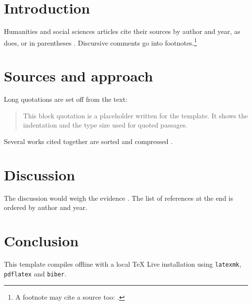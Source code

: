 \section{Introduction}
Humanities and social sciences articles cite their sources by author and year, as
\textcite{psg-hss-monograph} does, or in parentheses \parencite[see][12--14]{psg-hss-chapter}.
Discursive comments go into footnotes.\footnote{A footnote may cite a source too:
\cite{psg-hss-monograph}.}

\section{Sources and approach}
Long quotations are set off from the text:
\begin{quote}
  This block quotation is a placeholder written for the template. It shows the indentation and
  the type size used for quoted passages.
\end{quote}
Several works cited together are sorted and compressed
\parencite{psg-hss-chapter,psg-hss-monograph,psg-hss-journal}.

\section{Discussion}
The discussion would weigh the evidence \parencite{psg-hss-journal}. The list of references at
the end is ordered by author and year.

\section{Conclusion}
This template compiles offline with a local \TeX{} Live installation using \texttt{latexmk},
\texttt{pdflatex} and \texttt{biber}.
